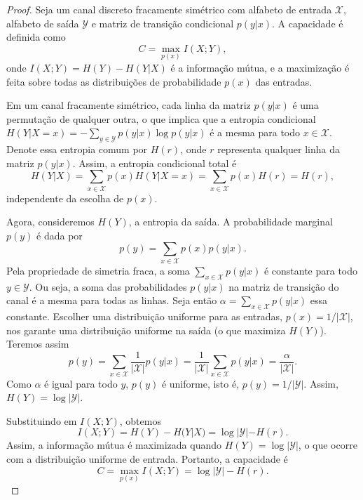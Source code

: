 \begin{proof}
Seja um canal discreto fracamente simétrico com alfabeto de entrada
$\mathcal{X}$, alfabeto de saída $\mathcal{Y}$ e matriz de transição
condicional $p(y|x)$. A capacidade é definida como
\begin{equation}
C = \max_{p(x)} I(X;Y),
\end{equation}
onde $I(X;Y) = H(Y) - H(Y|X)$ é a informação mútua, e a maximização é feita
sobre todas as distribuições de probabilidade $p(x)$ das entradas.

Em um canal fracamente simétrico, cada linha da matriz $p(y|x)$ é uma
permutação de qualquer outra, o que implica que a entropia condicional
$H(Y|X=x) = -\sum_{y \in \mathcal{Y}} p(y|x) \log p(y|x)$ é a mesma para todo
$x \in \mathcal{X}$. Denote essa entropia comum por $H(r)$, onde $r$ representa
qualquer linha da matriz $p(y|x)$. Assim, a entropia condicional total é
\begin{equation}
H(Y|X) = \sum_{x \in \mathcal{X}} p(x) H(Y|X=x) = \sum_{x \in \mathcal{X}} p(x) H(r) = H(r),
\end{equation}
independente da escolha de $p(x)$.

Agora, consideremos $H(Y)$, a entropia da saída. A probabilidade marginal
$p(y)$ é dada por
\begin{equation}
p(y) = \sum_{x \in \mathcal{X}} p(x) p(y|x).
\end{equation}
Pela propriedade de simetria fraca, a soma $\sum_{x \in \mathcal{X}} p(y|x)$ é
constante para todo $y \in \mathcal{Y}$. Ou seja, a soma das probabilidades $p(y|x)$ 
na matriz de transição do canal é a mesma para todas as linhas. Seja então 
  $\alpha = \sum_{x \in \mathcal{X}} p(y|x)$ essa constante. Escolher uma distribuição uniforme para
as entradas, $p(x) = 1/|\mathcal{X}|$, nos garante uma distribuição uniforme na saída
(o que maximiza $H(Y)$). Teremos assim
\begin{equation}  
p(y) = \sum_{x \in \mathcal{X}} \frac{1}{|\mathcal{X}|} p(y|x) = \frac{1}{|\mathcal{X}|} \sum_{x \in \mathcal{X}} p(y|x) = \frac{\alpha}{|\mathcal{X}|}.
\end{equation}
Como $\alpha$ é igual para todo $y$, $p(y)$ é uniforme, isto é, $p(y) = 1/|\mathcal{Y}|$.
Assim, $H(Y) = \log |\mathcal{Y}|$.

Substituindo em $I(X;Y)$, obtemos
\begin{equation}
I(X;Y) = H(Y) - H(Y|X) = \log |\mathcal{Y}| - H(r).
\end{equation}
Assim, a informação mútua é maximizada quando $H(Y) = \log |\mathcal{Y}|$, o que ocorre com a distribuição uniforme de entrada. Portanto, a capacidade é
\begin{equation}
C = \max_{p(x)} I(X;Y) = \log |\mathcal{Y}| - H(r).
\end{equation}
\end{proof}





